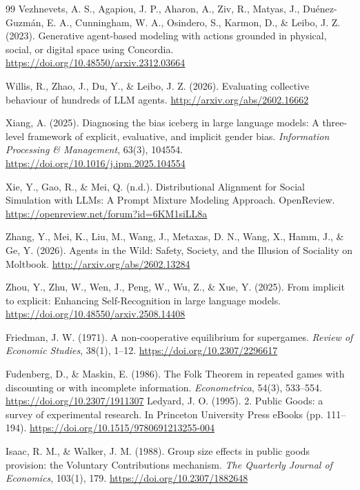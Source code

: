 \documentclass[12pt,letterpaper]{article}
\begin{document}
\begin{thebibliography}{99}
Vezhnevets, A. S., Agapiou, J. P., Aharon, A., Ziv, R., Matyas, J., Du\'enez-Guzm\'an, E. A., Cunningham, W. A., Osindero, S., Karmon, D., \& Leibo, J. Z. (2023). Generative agent-based modeling with actions grounded in physical, social, or digital space using Concordia. \url{https://doi.org/10.48550/arxiv.2312.03664}

Willis, R., Zhao, J., Du, Y., \& Leibo, J. Z. (2026). Evaluating collective behaviour of hundreds of LLM agents. \url{http://arxiv.org/abs/2602.16662}

Xiang, A. (2025). Diagnosing the bias iceberg in large language models: A three-level framework of explicit, evaluative, and implicit gender bias. \textit{Information Processing \& Management}, 63(3), 104554. \url{https://doi.org/10.1016/j.ipm.2025.104554}

Xie, Y., Gao, R., \& Mei, Q. (n.d.). Distributional Alignment for Social Simulation with LLMs: A Prompt Mixture Modeling Approach. OpenReview. \url{https://openreview.net/forum?id=6KM1siLL8a}

Zhang, Y., Mei, K., Liu, M., Wang, J., Metaxas, D. N., Wang, X., Hamm, J., \& Ge, Y. (2026). Agents in the Wild: Safety, Society, and the Illusion of Sociality on Moltbook. \url{http://arxiv.org/abs/2602.13284}

Zhou, Y., Zhu, W., Wen, J., Peng, W., Wu, Z., \& Xue, Y. (2025). From implicit to explicit: Enhancing Self-Recognition in large language models. \url{https://doi.org/10.48550/arxiv.2508.14408}

Friedman, J. W. (1971). A non-cooperative equilibrium for supergames. \textit{Review of Economic Studies}, 38(1), 1--12. \url{https://doi.org/10.2307/2296617}

Fudenberg, D., \& Maskin, E. (1986). The Folk Theorem in repeated games with discounting or with incomplete information. \textit{Econometrica}, 54(3), 533--554. \url{https://doi.org/10.2307/1911307}
Ledyard, J. O. (1995). 2. Public Goods: a survey of experimental research. In Princeton University Press eBooks (pp. 111--194). \url{https://doi.org/10.1515/9780691213255-004}

Isaac, R. M., \& Walker, J. M. (1988). Group size effects in public goods provision: the Voluntary Contributions mechanism. \textit{The Quarterly Journal of Economics}, 103(1), 179. \url{https://doi.org/10.2307/1882648}


\end{thebibliography}
\end{document}
